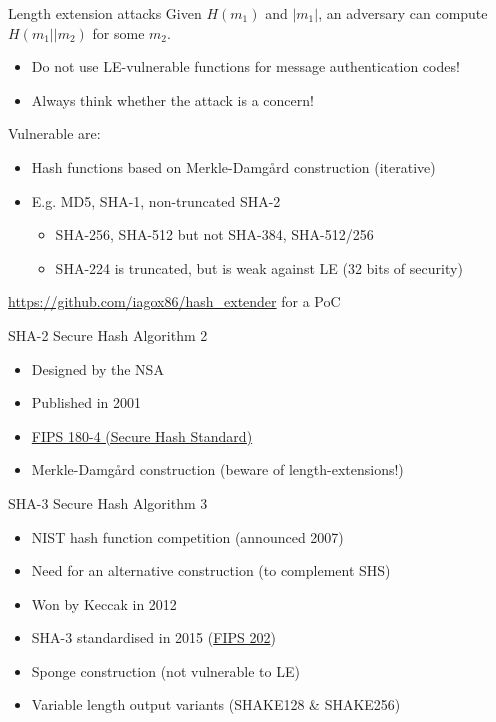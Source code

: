 \begin{frame}{Length extension attacks}
  Given $H(m_1)$ and $\lvert m_1\rvert$, an adversary can compute $H(m_1 || m_2)$ for some $m_2$.
  \begin{itemize}[<+(1)->]
    \item Do not use LE-vulnerable functions for message authentication codes!
    \item Always think whether the attack is a concern!
  \end{itemize}

  \vspace*{1em}

  \pause
  Vulnerable are:
  \begin{itemize}[<+(1)->]
    \item Hash functions based on Merkle-Damgård construction (iterative)
    \item E.g. MD5, SHA-1, non-truncated SHA-2
    \begin{itemize}
      \item SHA-256, SHA-512 but not SHA-384, SHA-512/256
      \item SHA-224 is truncated, but is weak against LE (32 bits of security)
    \end{itemize}
  \end{itemize}

  \pause
  {\scriptsize\url{https://github.com/iagox86/hash_extender} for a PoC}
\end{frame}

\begin{frame}{SHA-2}
  Secure Hash Algorithm 2
  \begin{itemize}
    \item Designed by the NSA
    \item Published in 2001
    \item \href{https://csrc.nist.gov/pubs/fips/180-4/upd1/final}{FIPS 180-4 (Secure Hash Standard)}
    \pause
    \item Merkle-Damgård construction (beware of length-extensions!) 
  \end{itemize}
\end{frame}

\begin{frame}{SHA-3}
  Secure Hash Algorithm 3
  \begin{itemize}[<+(1)->]
    \item NIST hash function competition (announced 2007)
    \item Need for an alternative construction (to complement SHS)
    \item Won by Keccak in 2012
    \item SHA-3 standardised in 2015 (\href{https://csrc.nist.gov/pubs/fips/202/final}{FIPS 202})
    \pause
    \item Sponge construction (not vulnerable to LE)
    \pause
    \item Variable length output variants (SHAKE128 \& SHAKE256)
  \end{itemize}
\end{frame}

